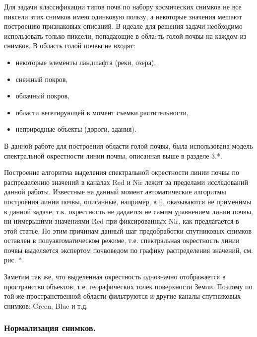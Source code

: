 \documentclass[12pt]{article}
\begin{document}
\par
Для задачи классификации типов почв по набору космических снимков не все пиксели этих снимков
имею одинковую пользу, а некоторые значения мешают построению признаковых описаний. В идеале
для решения задачи необходимо использовать только пиксели, попадающие в облаcть голой почвы
на каждом из снимков. В область голой почвы не входят:
\begin{itemize}
    \item некоторые элементы ландшафта (реки, озера),
    \item снежный покров,
    \item облачный покров,
    \item области вегетирующей в момент съемки растительности,
    \item неприродные объекты (дороги, здания).
\end{itemize}
В данной работе для построения области голой почвы, была использована
модель спектральной окрестности линии почвы, описанная выше в разделе {\color{red} 3.*}.
\par
Построение алгоритма выделения спектральной окрестности линии почвы по распределению 
значений в каналах Red и Nir лежит за пределами исследований данной работы. Известные на данный
момент автоматические алгоритмы построения линии почвы, описанные, например, в {\color{red}[]},
оказываются не применимы в данной задаче, т.к. окрестность не дадается не самим уравнением линии
почвы, ни нимерьшими значениями Red при фиксированных Nir, как предлагается в этой статье.
По этим причинам данный шаг предобработки спутниковых снимков оставлен в полуавтоматическом режиме,
т.е. спектральная окрестность линии почвы выделяется экспертом почвоведом по графику распределения
значений, см. рис. {\color{red}*}.
\par
Заметим так же, что выделенная окрестность однозначно отображается в пространство объектов,
т.е. георафических точек поверхности Земли. Поэтому по той же пространственной области
фильтруются и другие каналы спутниковых снимков: Green, Blue и т.д.

\subsubsection{Нормализация снимков.}
\end{document}
